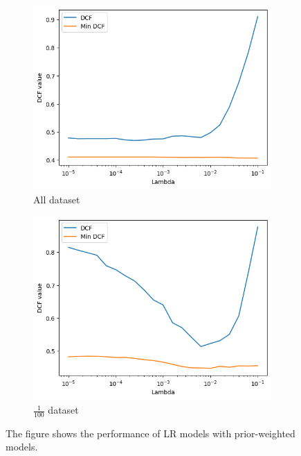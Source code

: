\documentclass{article}
\begin{document}
\begin{figure}[ht]
    \centering
    \begin{subfigure}[b]{0.45\textwidth}
        \centering
        \includegraphics[width=\textwidth]{images/lr_lambda_prior.png}
        \caption{All dataset}
        \label{fig:lr_lambda_prior}
    \end{subfigure}
    \hfill
    \begin{subfigure}[b]{0.45\textwidth}
        \centering
        \includegraphics[width=\textwidth]{images/lr_lambda_100_prior.png}
        \caption{$\frac{1}{100}$ dataset}
        \label{fig:lr_lambda_100_prior}
    \end{subfigure}
    \caption{The figure shows the performance of LR models with prior-weighted models.}
\end{figure}
\end{document}
